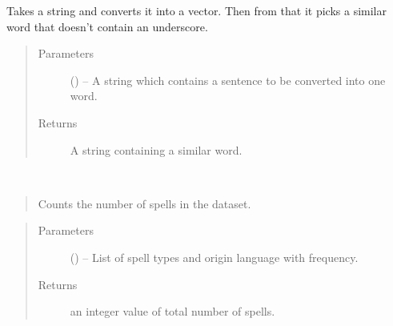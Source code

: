 \documentclass[letterpaper,10pt,english]{sphinxmanual}
\begin{document}

\begin{fulllineitems}
\label{\detokenize{code:hp_spells.sentenceToWord}}
Takes a string and converts it into a vector. Then from that it picks a similar word that doesn't contain an underscore.
\begin{quote}\begin{description}
\item[{Parameters}] \leavevmode
{} () -- A string which contains a sentence to be converted into one word.

\item[{Returns}] \leavevmode
A string containing a similar word.

\end{description}\end{quote}

\end{fulllineitems}


\begin{fulllineitems}
\label{\detokenize{code:hp_spells.totalSpells}}~\begin{quote}

Counts the number of spells in the dataset.
\end{quote}
\begin{quote}\begin{description}
\item[{Parameters}] \leavevmode
{} (\sphinxstyleliteralemphasis{}\sphinxstyleliteralemphasis{{[}}\sphinxstyleliteralemphasis{}\sphinxstyleliteralemphasis{{[}}\sphinxstyleliteralemphasis{}\sphinxstyleliteralemphasis{{[}}\sphinxstyleliteralemphasis{,}\sphinxstyleliteralemphasis{{]}}\sphinxstyleliteralemphasis{}\sphinxstyleliteralemphasis{, }\sphinxstyleliteralemphasis{{]}}\sphinxstyleliteralemphasis{{]}}\sphinxstyleliteralemphasis{}) -- List of spell types and origin language with frequency.

\item[{Returns}] \leavevmode
an integer value of total number of spells.

\end{description}\end{quote}

\end{fulllineitems}
\end{document}
